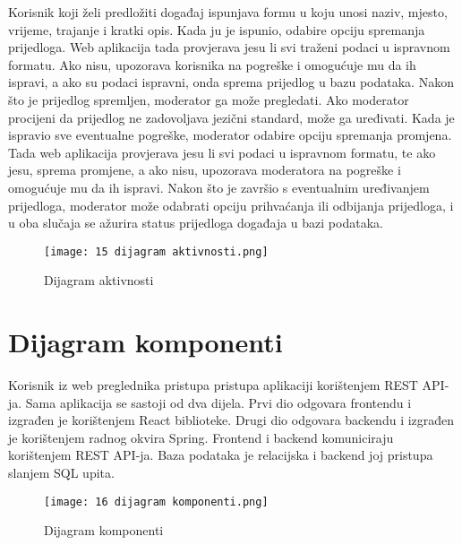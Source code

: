 		Korisnik koji želi predložiti događaj ispunjava formu u koju unosi naziv, mjesto, vrijeme, trajanje i kratki opis. Kada ju je ispunio, odabire opciju spremanja prijedloga. Web aplikacija tada provjerava jesu li svi traženi podaci u ispravnom formatu. Ako nisu, upozorava korisnika na pogreške i omogućuje mu da ih ispravi, a ako su podaci ispravni, onda sprema prijedlog u bazu podataka. Nakon što je prijedlog spremljen, moderator ga može pregledati. Ako moderator procijeni da prijedlog ne zadovoljava jezični standard, može ga uređivati. Kada je ispravio sve eventualne pogreške, moderator odabire opciju spremanja promjena. Tada web aplikacija provjerava jesu li svi podaci u ispravnom formatu, te ako jesu, sprema promjene, a ako nisu, upozorava moderatora na pogreške i omogućuje mu da ih ispravi. Nakon što je završio s eventualnim uređivanjem prijedloga, moderator može odabrati opciju prihvaćanja ili odbijanja prijedloga, i u oba slučaja se ažurira status prijedloga događaja u bazi podataka.
			
			\begin{figure}[H]
					\centering
					\texttt{[image: 15 dijagram aktivnosti.png]}
					\caption{Dijagram aktivnosti}
				\end{figure}	
				\newpage		
			
			\eject
		\section{Dijagram komponenti}
		
		 Korisnik iz web preglednika pristupa pristupa aplikaciji korištenjem REST API-ja. Sama aplikacija se sastoji od dva dijela. Prvi dio odgovara frontendu i izgrađen je korištenjem React biblioteke. Drugi dio odgovara backendu i izgrađen je korištenjem radnog okvira Spring. Frontend i backend komuniciraju korištenjem REST API-ja. Baza podataka je relacijska i backend joj pristupa slanjem SQL upita.
		
			\begin{figure}[H]
					\centering
					\texttt{[image: 16 dijagram komponenti.png]}
					\caption{Dijagram komponenti}
				\end{figure}	
				\newpage			
